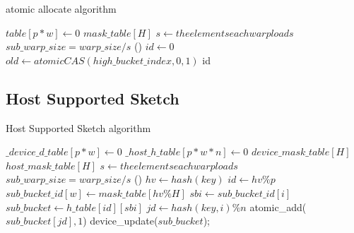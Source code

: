 \documentclass[conference]{IEEEtran}
\begin{document}
\begin{algorithm}
    \DontPrintSemicolon
    \caption{atomic allocate algorithm}
    $table[p * w] \longleftarrow 0$\;
    $mask\_table[H]$\;
    $s \longleftarrow the elements each warp loads$\;
    $sub\_warp\_size = warp\_size / s $\;
\Fn(){}
{
    $id \leftarrow 0$\;
    $old \leftarrow atomicCAS(high\_bucket\_index, 0, 1)$\;
    \KwRet id\;
}
\end{algorithm}

\subsection{Host Supported Sketch}

\begin{algorithm}
    \DontPrintSemicolon
    \caption{Host Supported Sketch algorithm}
    $\_device\_ d\_table[p * w] \longleftarrow 0$\;
    $\_host\_ h\_table[p * w * n] \longleftarrow 0$\;
    $device\_mask\_table[H]$\;
    $host\_mask\_table[H]$\;
    $s \longleftarrow the elements each warp loads$\;
    $sub\_warp\_size = warp\_size / s $\;
\Fn(){}
{
    {
        $hv \leftarrow hash(key)$\;
        $id \leftarrow hv \% p$\;
        $sub\_bucket\_id[w] \leftarrow mask\_table[hv \% H]$\;
        {
            $sbi \leftarrow sub\_bucket\_id[i]$\;
            $sub\_bucket \leftarrow h\_table[id][sbi]$\;
            $jd \leftarrow hash(key, i) \% n$\;
            atomic\_add($sub\_bucket[jd], 1$)\;
            device\_update($sub\_bucket$);
        }
    }
}
\end{algorithm}
\end{document}
